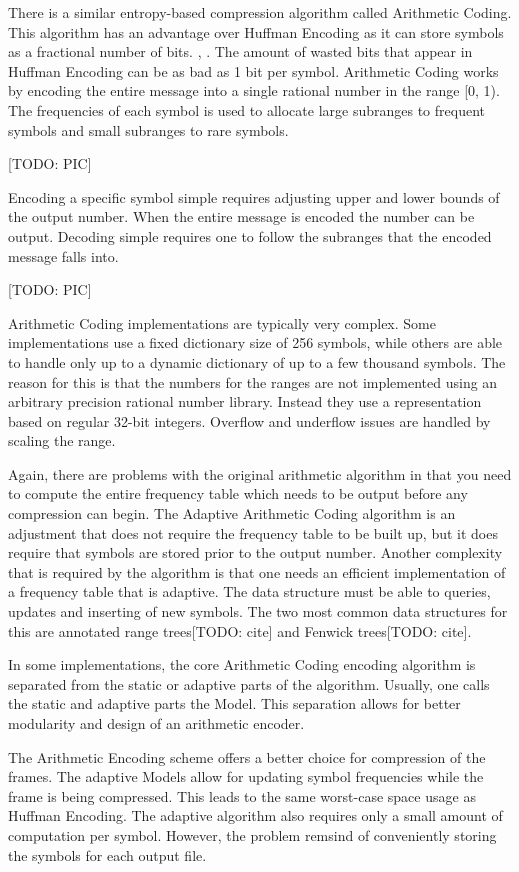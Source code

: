 \documentclass[a4paper,11pt]{report}
\begin{document}
There is a similar entropy-based compression algorithm called Arithmetic Coding. This algorithm has an advantage over Huffman Encoding as it can store symbols as a fractional number of bits. \cite{RefWorks:1}, \cite{RefWorks:3}. The amount of wasted bits that appear in Huffman Encoding can be as bad as 1 bit per symbol. Arithmetic Coding works by encoding the entire message into a single rational number in the range [0, 1). The frequencies of each symbol is used to allocate large subranges to frequent symbols and small subranges to rare symbols. 

[TODO: PIC]

Encoding a specific symbol simple requires adjusting upper and lower bounds of the output number. When the entire message is encoded the number can be output. Decoding simple requires one to follow the subranges that the encoded message falls into.

[TODO: PIC]

Arithmetic Coding implementations are typically very complex. Some implementations use a fixed dictionary size of 256 symbols, while others are able to handle only up to a dynamic dictionary of up to a few thousand symbols. The reason for this is that the numbers for the ranges are not implemented using an arbitrary precision rational number library. Instead they use a representation based on regular 32-bit integers. Overflow and underflow issues are handled by scaling the range.

Again, there are problems with the original arithmetic algorithm in that you need to compute the entire frequency table which needs to be output before any compression can begin. The Adaptive Arithmetic Coding algorithm is an adjustment that does not require the frequency table to be built up, but it does require that symbols are stored prior to the output number. Another complexity that is required by the algorithm is that one needs an efficient implementation of a frequency table that is adaptive. The data structure must be able to queries, updates and inserting of new symbols. The two most common data structures for this are annotated range trees[TODO: cite] and Fenwick trees[TODO: cite].

In some implementations, the core Arithmetic Coding encoding algorithm is separated from the static or adaptive parts of the algorithm. Usually, one calls the static and adaptive parts the Model. This separation allows for better modularity and design of an arithmetic encoder.

The Arithmetic Encoding scheme offers a better choice for compression of the frames. The adaptive Models allow for updating symbol frequencies while the frame is being compressed. This leads to the same worst-case space usage as Huffman Encoding. The adaptive algorithm also requires only a small amount of computation per symbol. However, the problem remsind of conveniently storing the symbols for each output file.
\end{document}
